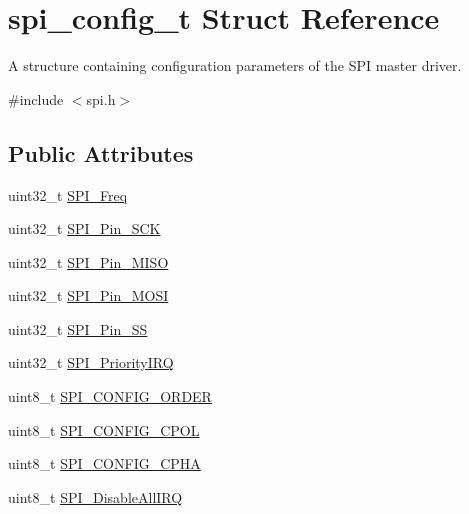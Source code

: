 \hypertarget{structspi__config__t}{}\section{spi\+\_\+config\+\_\+t Struct Reference}
\label{structspi__config__t}


A structure containing configuration parameters of the S\+P\+I master driver.  




{\ttfamily \#include $<$spi.\+h$>$}

\subsection*{Public Attributes}
\begin{DoxyCompactItemize}
\item 
uint32\+\_\+t \hyperlink{structspi__config__t_aa6e0844c0a2a780bc188cab9ffb11e8c}{S\+P\+I\+\_\+\+Freq}
\item 
uint32\+\_\+t \hyperlink{structspi__config__t_a757ca4b282e3ca8e6eb542092d2b24a9}{S\+P\+I\+\_\+\+Pin\+\_\+\+S\+C\+K}
\item 
uint32\+\_\+t \hyperlink{structspi__config__t_a4ec727e95918e191cb86e097551a1c0e}{S\+P\+I\+\_\+\+Pin\+\_\+\+M\+I\+S\+O}
\item 
uint32\+\_\+t \hyperlink{structspi__config__t_a89ded8ee677dc15a50fef11237137fad}{S\+P\+I\+\_\+\+Pin\+\_\+\+M\+O\+S\+I}
\item 
uint32\+\_\+t \hyperlink{structspi__config__t_ad89bce38af613f58fa4510939a3a4808}{S\+P\+I\+\_\+\+Pin\+\_\+\+S\+S}
\item 
uint32\+\_\+t \hyperlink{structspi__config__t_a406e10b178f91ded58d0825fa92b7466}{S\+P\+I\+\_\+\+Priority\+I\+R\+Q}
\item 
uint8\+\_\+t \hyperlink{structspi__config__t_a6e4ea71d5db65c5eb7cc4e20baeb3f89}{S\+P\+I\+\_\+\+C\+O\+N\+F\+I\+G\+\_\+\+O\+R\+D\+E\+R}
\item 
uint8\+\_\+t \hyperlink{structspi__config__t_ad41a5691e4ac37cfa57c42b652dd238a}{S\+P\+I\+\_\+\+C\+O\+N\+F\+I\+G\+\_\+\+C\+P\+O\+L}
\item 
uint8\+\_\+t \hyperlink{structspi__config__t_ad9eb713daa72e7c8f73c882ab891d19e}{S\+P\+I\+\_\+\+C\+O\+N\+F\+I\+G\+\_\+\+C\+P\+H\+A}
\item 
uint8\+\_\+t \hyperlink{structspi__config__t_a192bd62026822c91500c855ead762930}{S\+P\+I\+\_\+\+Disable\+All\+I\+R\+Q}
\end{DoxyCompactItemize}


